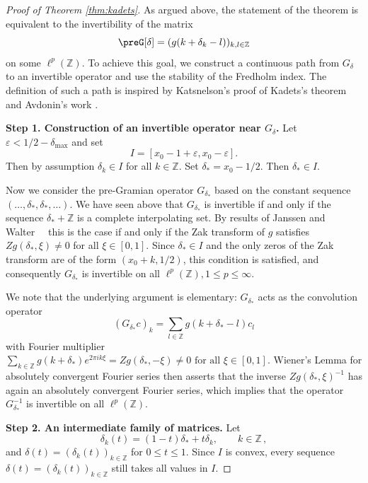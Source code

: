 \documentclass[reqno,a4paper,12pt]{amsart}
\numberwithin{equation}{section}
\def\Z{{\mathbb Z}}
\newcommand\1{\mathds{1}}
\begin{document}
\begin{proof}[Proof of Theorem \ref{thm:kadets}]
As  argued above, the statement of the theorem is equivalent to the
invertibility of  the matrix
\begin{equation}
        \preG[\delta] = (g(k+\delta_k-l))_{k,l\in\Z}
    \end{equation}
    on some  $\ell^p(\Z)$. To achieve this goal, we construct a
    continuous path from $G_\delta $ to an invertible operator and use the
    stability of the Fredholm index. The definition of such a path is inspired by Katsnelson's proof of Kadets's
theorem \cite{Kac71} and Avdonin's work  \cite{avdonin}. 

    \textbf{Step 1. Construction of an invertible operator near
      $G_\delta $.} Let $\varepsilon < 1/2 - \delta _{\max }$ and  set
    $$
    I=[x_0-1+\varepsilon,x_0-\varepsilon].
$$
Then  by assumption  $\delta_k\in I$ for all
$k\in\Z$.
Set $
\delta _* =  x_0  - 1/2$. Then $\delta _* \in I $.

Now we consider the pre-Gramian
operator $G_{\delta _*}$ based on the constant sequence $( \dots,
\delta _*, \delta _*, \dots )$.
We have seen above that $G_{\delta _*}$ is invertible if and only if
the sequence $\delta _* + \Z $ is a complete interpolating set. By
results of Janssen and Walter~~\cite{janssen94a,walter94} this is the
case if and only if the Zak transform of $g$ satisfies $Zg(\delta _*,
\xi ) \neq 0$ for all $\xi \in [0,1]$. Since $\delta _*\in I$ and
the only zeros of the Zak transform are of the form $(x_0 + k,1/2)$, this condition is
satisfied, and consequently $G_{\delta _*}$ is invertible on all $\ell
^p(\Z), 1\leq p \leq \infty $.

We note that the underlying argument is elementary: $G_{\delta _*}$
acts as the convolution operator  
$$
    (G_{\delta_*}c)_k
    =
    \sum_{l\in\mathbb Z}g(k+\delta_*-l)c_l 
    $$
with     Fourier multiplier
$
\sum _{k\in \Z } g(k+\delta _*) e^{2\pi i k\xi } =     Zg(\delta _*,
-\xi )  \neq 0 \text{ for all } \xi \in [0,1] 
$.
 Wiener's  Lemma for absolutely convergent
Fourier series then asserts that the inverse $Zg(\delta _*, \xi
)^{-1}$ has again an absolutely convergent
Fourier series, which implies that the   operator $G_{\delta
  _*}^{-1}$ is invertible on all $\ell ^p(\Z)$.

\textbf{Step 2. An intermediate family of matrices.} 
Let
$$
    \delta_k(t)=(1-t)\delta_*+t\delta_k,\qquad k\in\mathbb Z \, ,
$$
and $\delta (t) = (\delta _k(t))_{k\in \Z }$ for  $0\leq
t\leq1$. Since $I$ is convex, every sequence $\delta(t) = 
(\delta _k(t))_{k\in \Z}$ still takes all   values
in $I$.


\end{proof}
\end{document}
